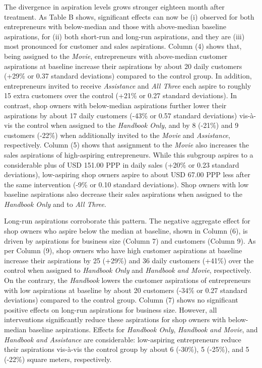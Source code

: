 \documentclass[11.5pt]{article}
\begin{document}
The divergence in aspiration levels grows stronger eighteen month after treatment. As Table B shows, significant effects can now be (i) observed for both entrepreneurs with below-median and those with above-median baseline aspirations, for (ii) both short-run and long-run aspirations, and they are (iii) most pronounced for customer and sales aspirations. Column (4) shows that, being assigned to the \emph{Movie}, entrepreneurs with above-median customer aspirations at baseline increase their aspirations by about 20 daily customers (+29\% or 0.37 standard deviations) compared to the control group. In addition, entrepreneurs invited to receive \emph{Assistance} and \emph{All Three} each aspire to roughly 15 extra customers over the control (+21\% or 0.27 standard deviations). In contrast, shop owners with below-median aspirations further lower their aspirations by about 17 daily customers (-43\% or 0.57 standard deviations) vis-\`{a}-vis the control when assigned to the \emph{Handbook Only}, and by 8 (-21\%) and 9 customers (-22\%) when additionally invited to the \emph{Movie} and \emph{Assistance}, respectively. Column (5) shows that assignment to the \emph{Movie} also increases the sales aspirations of high-aspiring entrepreneurs. While this subgroup aspires to a considerable plus of USD 151.00 PPP in daily sales (+20\% or 0.23 standard deviations), low-aspiring shop owners aspire to about USD 67.00 PPP less after the same intervention (-9\% or 0.10 standard deviations). Shop owners with low baseline aspirations also decrease their sales aspirations when assigned to the \emph{Handbook Only} and to \emph{All Three}.

Long-run aspirations corroborate this pattern. The negative aggregate effect for shop owners who aspire below the median at baseline, shown in Column (6), is driven by aspirations for business size (Column 7) and customers (Column 9). As per Column (9), shop owners who have high customer aspirations at baseline increase their aspirations by 25 (+29\%) and 36 daily customers (+41\%) over the control when assigned to \emph{Handbook Only} and \emph{Handbook and Movie}, respectively. On the contrary, the \emph{Handbook} lowers the customer aspirations of entrepreneurs with low aspirations at baseline by about 20 customers (-34\% or 0.27 standard deviations) compared to the control group. Column (7) shows no significant positive effects on long-run aspirations for business size. However, all interventions significantly reduce these aspirations for shop owners with below-median baseline aspirations. Effects for \emph{Handbook Only}, \emph{Handbook and Movie}, and \emph{Handbook and Assistance} are considerable: low-aspiring entrepreneurs reduce their aspirations vis-\`{a}-vis the control group by about 6 (-30\%), 5 (-25\%), and 5 (-22\%) square meters, respectively.
\end{document}
